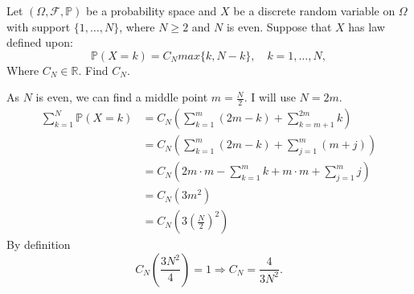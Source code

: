 \begin{exercise}[]
    \label{ex:12.5}
    Let $(\Omega, \mathcal{F}, \mathbb{P})$ be a probability space and $X$ be a discrete random variable on $\Omega$ with 
    support $\{1,\ldots, N\} $, where $N\ge 2$ and $N$ is even. Suppose that $X$ has law defined upon:
    \[
    \mathbb{P}(X=k) = C_N max \{k, N-k\}, \quad k=1,\ldots,N
    ,\] 
    Where $C_N \in \mathbb{R}$. Find $C_N$.

    As $N$ is even, we can find a middle point $m = \frac{N}{2}$. I will use $N=2m$.
    \begin{align*}
    \sum_{k=1}^{N} \mathbb{P}(X = k) &= C_N(\sum_{k=1}^{m} (2m - k) + \sum_{k=m+1}^{2m} k )\\
    &= C_N(\sum_{k=1}^{m} (2m - k) + \sum_{j=1}^{m} (m + j)) \\
    &= C_N(2m\cdot m - \sum_{k=1}^{m} k + m\cdot m  + \sum_{j=1}^{m} j) \\
    &= C_N(3m^{2}) \\
    &= C_N(3(\frac{N}{2})^{2})
    \end{align*}
    By definition
    \[
    C_N(\frac{3N^{2}}{4}) = 1 \Rightarrow C_N = \frac{4}{3N^{2}}
    .\] 
\end{exercise}
